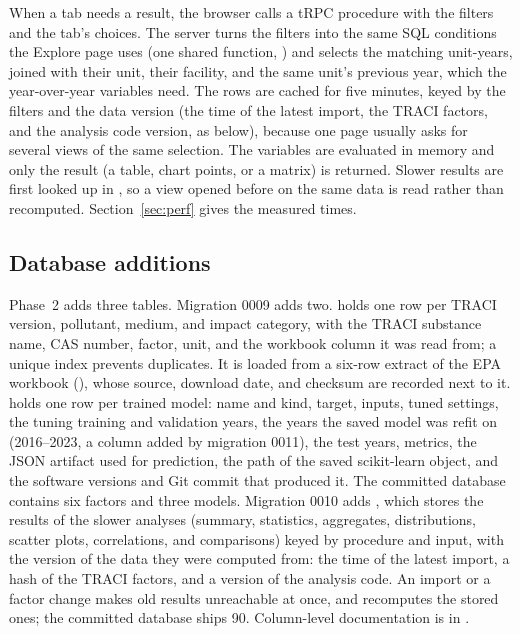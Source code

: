 \documentclass[11pt,a4paper]{article}
\begin{document}
When a tab needs a result, the browser calls a tRPC procedure with the filters and the tab's
choices. The server turns the filters into the same SQL conditions the Explore page uses (one
shared function, ) and selects the matching unit-years, joined with
their unit, their facility, and the same unit's previous year, which the year-over-year
variables need. The rows are cached for five minutes, keyed by the filters and the data version (the time
of the latest import, the TRACI factors, and the analysis code version, as below), because one page usually asks for several views of the same selection. The
variables are evaluated in memory and only the result (a table, chart points, or a matrix) is
returned. Slower results are first looked up in , so a view opened before
on the same data is read rather than recomputed. Section~\ref{sec:perf} gives the measured times.

\subsection{Database additions}

Phase~2 adds three tables. Migration 0009 adds two.  holds one row per TRACI version,
pollutant, medium, and impact category, with the TRACI substance name, CAS number, factor, unit,
and the workbook column it was read from; a unique index prevents duplicates. It is loaded from
a six-row extract of the EPA workbook (), whose source,
download date, and checksum are recorded next to it.  holds one row per trained
model: name and kind, target, inputs, tuned settings, the tuning training and validation years,
the years the saved model was refit on (2016--2023, a column added by migration 0011), the test years,
metrics, the JSON artifact used for prediction, the path of the saved scikit-learn object, and
the software versions and Git commit that produced it. The committed database contains six
factors and three models. Migration 0010 adds , which stores the results of
the slower analyses (summary, statistics, aggregates, distributions, scatter plots,
correlations, and comparisons) keyed by procedure and input, with the version of the data they
were computed from: the time of the latest import, a hash of the TRACI factors, and a version of
the analysis code. An import or a factor change makes old results unreachable at once, and
 recomputes the stored ones; the committed database ships 90.
Column-level documentation is in .
\end{document}
